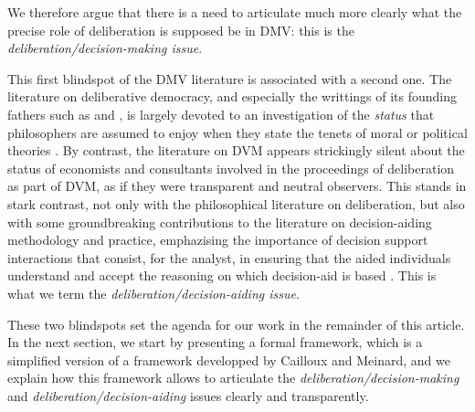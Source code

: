 \documentclass[smallextended,nospthms,natbib]{svjour3}
\begin{document}
We therefore argue that there is a need to articulate much more clearly what the precise role of deliberation is supposed be in DMV: this is the \emph{deliberation/decision-making issue}.

This first blindspot of the DMV literature is associated with a second one. The literature on deliberative democracy, and especially the writtings of its founding fathers such as \citet{rawls_political_2005} and \citet{habermas_faktizitat_1992}, is largely devoted to an investigation of the \emph{status} that philosophers are assumed to enjoy when they state the tenets of moral or political theories \citep{meinard_du_2014}. By contrast, the literature on DVM appears strickingly silent about the status of economists and consultants involved in the proceedings of deliberation as part of DVM, as if they were transparent and neutral observers. This stands in stark contrast, not only with the philosophical literature on deliberation, but also with some groundbreaking contributions to the literature on decision-aiding methodology and practice, emphazising the importance of decision support interactions that consist, for the analyst, in ensuring that the aided individuals understand and accept the reasoning on which decision-aid is based \citep{roy_multicriteria_1996}. This is what we term the \emph{deliberation/decision-aiding issue}.

These two blindspots set the agenda for our work in the remainder of this article. In the next section, we start by presenting a formal framework, which is a simplified version of a framework developped by Cailloux and Meinard, and we explain how this framework allows to articulate the \emph{deliberation/decision-making} and \emph{deliberation/decision-aiding} issues clearly and transparently.
\end{document}
